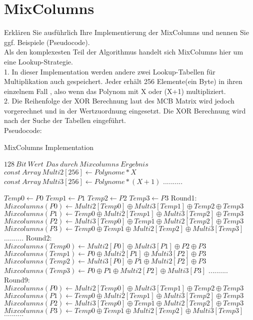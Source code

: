 \documentclass[abstract,bibliography=totocnumbered,listof=leveldown,open=any,titlepage]{scrreprt}
\DeclareMathOperator*{\OPLUS}{\oplus}
\begin{document}
        \section{MixColumns}
		Erklären Sie ausführlich Ihre Implementierung der MixColumns und nennen Sie ggf. Beispiele (Pseudocode).\vspace{3mm} \\
		Als den komplexesten Teil der Algorithmus handelt sich MixColumns hier um eine Lookup-Strategie. \vspace{1mm} \\
		1. In dieser Implementation werden andere zwei Lookup-Tabellen für Multiplikation auch gespeichert. Jeder erhält 256 Elemente(ein Byte) in ihren einzelnem Fall , also wenn das Polynom mit X oder (X+1) multipliziert.  \\
		2. Die Reihenfolge der XOR Berechnung laut des MCB Matrix wird jedoch vorgerechnet und in der Wertzuordnung eingesetzt. Die XOR Berechnung wird nach der Suche der Tabellen eingeführt.\vspace{1mm}\\
		Pseudocode: 
		\begin{algorithm}  %
			\caption{MixColumns Implementation}   %
			\label{alg1} %
			\begin{algorithmic}                    %
				\REQUIRE $128\ Bit\ Wert$
				\ENSURE $Das\ durch\ Mixcolumns\ Ergebnis$
				\STATE $const\ Array\ Multi2[256] \gets {Polynome * X}$
				\STATE $const\ Array\ Multi3[256] \gets {Polynome * (X+1)}$
				\STATE $..........$

				\STATE ${Temp0 \gets P0}$
				\STATE ${Temp1 \gets P1}$
				\STATE ${Temp2 \gets P2}$
				\STATE ${Temp3 \gets P3}$			
				\STATE Round1:
				\STATE ${Mixcolumns(P0) \gets Multi2[Temp0] \OPLUS Multi3[Temp1] \OPLUS Temp2 \OPLUS Temp3}$
				\STATE ${Mixcolumns(P1) \gets  Temp0 \OPLUS Multi2[Temp1] \OPLUS Multi3[Temp2] \OPLUS Temp3}$
 				\STATE ${Mixcolumns(P2) \gets Multi3[Temp0] \OPLUS Temp1 \OPLUS Multi2[Temp2] \OPLUS Temp3}$
				\STATE ${Mixcolumns(P3) \gets Temp0 \OPLUS Temp1 \OPLUS Multi2[Temp2] \OPLUS Multi3[Temp3] }$
				\STATE $..........$
				\STATE Round2:
				\STATE ${Mixcolumns(Temp0) \gets Multi2[P0] \OPLUS Multi3[P1] \OPLUS P2 \OPLUS P3}$
				\STATE ${Mixcolumns(Temp1) \gets  P0 \OPLUS Multi2[P1] \OPLUS Multi3[P2] \OPLUS P3}$
				\STATE ${Mixcolumns(Temp2) \gets Multi3[P0] \OPLUS P1 \OPLUS Multi2[P2] \OPLUS P3}$
				\STATE ${Mixcolumns(Temp3) \gets P0 \OPLUS P1 \OPLUS Multi2[P2] \OPLUS Multi3[P3] }$
				\STATE $..........$
				\STATE Round9:
				\STATE ${Mixcolumns(P0) \gets Multi2[Temp0] \OPLUS Multi3[Temp1] \OPLUS Temp2 \OPLUS Temp3}$
				\STATE ${Mixcolumns(P1) \gets  Temp0 \OPLUS Multi2[Temp1] \OPLUS Multi3[Temp2] \OPLUS Temp3}$
				\STATE ${Mixcolumns(P2) \gets Multi3[Temp0] \OPLUS Temp1 \OPLUS Multi2[Temp2] \OPLUS Temp3}$
				\STATE ${Mixcolumns(P3) \gets Temp0 \OPLUS Temp1 \OPLUS Multi2[Temp2] \OPLUS Multi3[Temp3] }$
				\STATE $..........$			
			\end{algorithmic}
		\end{algorithm}
\end{document}

